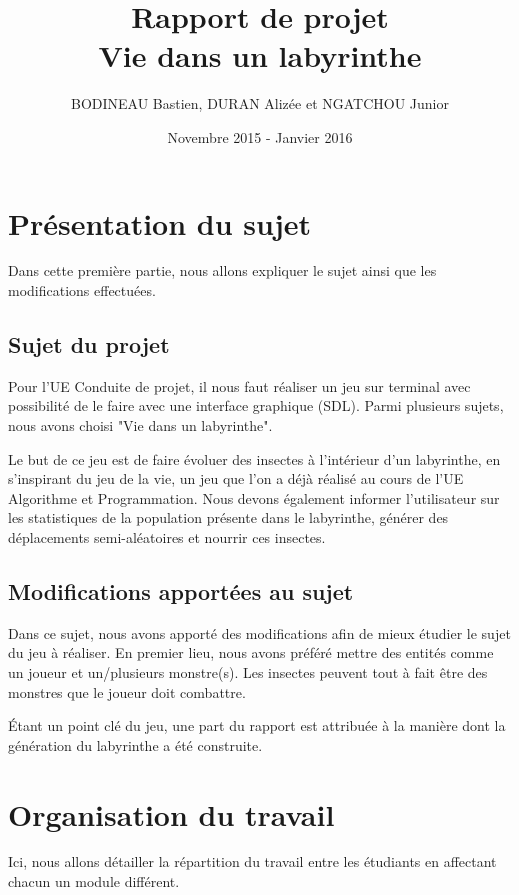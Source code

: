 \documentclass[a4paper,11pt]{report}
\title{\textbf{Rapport de projet}\linebreak
\\
Vie dans un labyrinthe}
\author{BODINEAU Bastien, DURAN Alizée et NGATCHOU Junior}
\date{Novembre 2015 - Janvier 2016}
\begin{document}
  \maketitle
  \tableofcontents

  \chapter{Présentation du sujet}
  Dans cette première partie, nous allons expliquer le sujet ainsi que les modifications effectuées.
    \section{Sujet du projet}
    Pour l'UE Conduite de projet, il nous faut réaliser un jeu sur terminal avec possibilité de le faire avec une interface graphique (SDL). Parmi plusieurs sujets, nous avons choisi "Vie dans un labyrinthe". 

    Le but de ce jeu est de faire évoluer des insectes à l'intérieur d'un labyrinthe, en s'inspirant du jeu de la vie, un jeu que l'on a déjà réalisé au cours de l'UE Algorithme et Programmation. Nous devons également informer l'utilisateur sur les statistiques de la population présente dans le labyrinthe, générer des déplacements semi-aléatoires et nourrir ces insectes.
    \section{Modifications apportées au sujet}
    Dans ce sujet, nous avons apporté des modifications afin de mieux étudier le sujet du jeu à réaliser. En premier lieu, nous avons préféré mettre des entités comme un joueur et un/plusieurs monstre(s). Les insectes peuvent tout à fait être des monstres que le joueur doit combattre.

    Étant un point clé du jeu, une part du rapport est attribuée à la manière dont la génération du labyrinthe a été construite.
  \chapter{Organisation du travail}
  Ici, nous allons détailler la répartition du travail entre les étudiants en affectant chacun un module différent.
\end{document}
